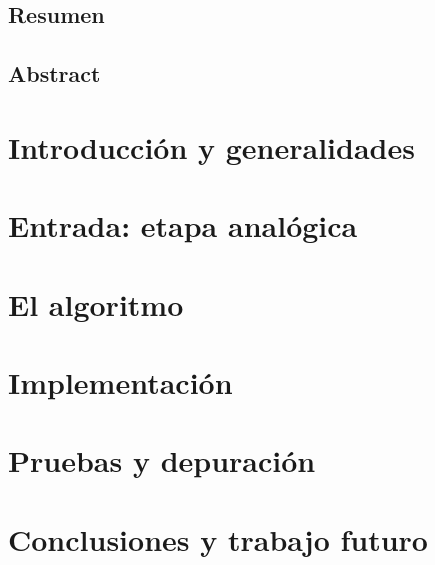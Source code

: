 \documentclass[a4paper, 11pt, oneside, openright]{report}
\begin{document}
\newpage
\vspace*{5cm}


\newpage
\section*{Resumen}

\section*{Abstract}


\newpage
\thispagestyle{empty}
\tableofcontents
\clearpage
{}
\pagestyle{fancy}
\chapter{Introducción y generalidades}


\chapter{Entrada: etapa analógica}


\chapter{El algoritmo}


\chapter{Implementación}


\chapter{Pruebas y depuración}


\chapter{Conclusiones y trabajo futuro}

\end{document}
